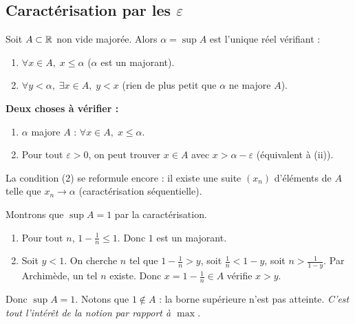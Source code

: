 \subsection{Caractérisation par les $\varepsilon$}

\begin{propbox}
Soit $A \subset \mathbb{R}$ non vide majorée. Alors $\alpha = \sup A$ est l'unique réel vérifiant :
\begin{enumerate}[leftmargin=1.5cm]
  \item[(i)] $\forall x \in A,\; x \leqslant \alpha$ \quad ($\alpha$ est un majorant).
  \item[(ii)] $\forall y < \alpha,\; \exists x \in A,\; y < x$ \quad (rien de plus petit que $\alpha$ ne majore $A$).
\end{enumerate}
\end{propbox}

\begin{methodbox}[Comment montrer $\sup A = \alpha$]
\textbf{Deux choses à vérifier :}
\begin{enumerate}[leftmargin=1.5cm]
  \item $\alpha$ majore $A$ : $\forall x \in A,\; x \leqslant \alpha$.
  \item Pour tout $\varepsilon > 0$, on peut trouver $x \in A$ avec $x > \alpha - \varepsilon$ (équivalent à (ii)).
\end{enumerate}
La condition (2) se reformule encore : il existe une suite $(x_n)$ d'éléments de $A$ telle que $x_n \to \alpha$ (caractérisation séquentielle).
\end{methodbox}

\begin{exbox}[Application : $A = \{ 1 - \tfrac{1}{n} \mid n \in \N^* \}$]
Montrons que $\sup A = 1$ par la caractérisation.
\begin{enumerate}[leftmargin=1.5cm]
  \item[(i)] Pour tout $n$, $1 - \frac{1}{n} \leqslant 1$. Donc $1$ est un majorant.
  \item[(ii)] Soit $y < 1$. On cherche $n$ tel que $1 - \frac{1}{n} > y$, soit $\frac{1}{n} < 1 - y$, soit $n > \frac{1}{1-y}$. Par Archimède, un tel $n$ existe. Donc $x = 1 - \frac{1}{n} \in A$ vérifie $x > y$.
\end{enumerate}
Donc $\sup A = 1$. Notons que $1 \notin A$ : la borne supérieure n'est pas atteinte. \emph{C'est tout l'intérêt de la notion par rapport à $\max$.}
\end{exbox}

